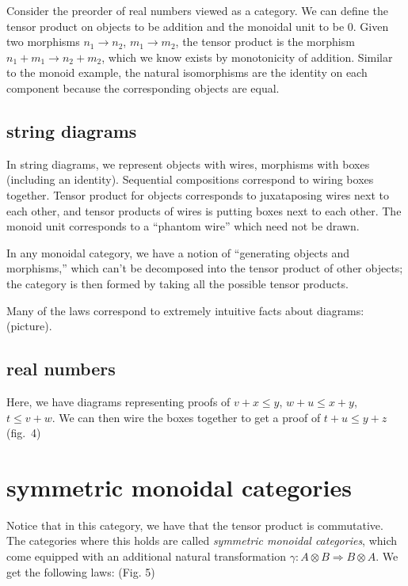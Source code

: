 Consider the preorder of real numbers viewed as a category. We can
define the tensor product on objects to be addition and the monoidal
unit to be 0. Given two morphisms \(n_1 \to n_2\), \(m_1 \to m_2\), the
tensor product is the morphism \(n_1 + m_1 \to n_2 + m_2\), which we
know exists by monotonicity of addition. Similar to the monoid example,
the natural isomorphisms are the identity on each component because the
corresponding objects are equal.

\hypertarget{string-diagrams}{%
\subsection{string diagrams}\label{string-diagrams}}

In string diagrams, we represent objects with wires, morphisms with
boxes (including an identity). Sequential compositions correspond to
wiring boxes together. Tensor product for objects corresponds to
juxataposing wires next to each other, and tensor products of wires is
putting boxes next to each other. The monoid unit corresponds to a
``phantom wire'' which need not be drawn.

In any monoidal category, we have a notion of ``generating objects and
morphisms,'' which can't be decomposed into the tensor product of other
objects; the category is then formed by taking all the possible tensor
products.

Many of the laws correspond to extremely intuitive facts about diagrams:
(picture).

\hypertarget{real-numbers-1}{%
\subsection{real numbers}\label{real-numbers-1}}

Here, we have diagrams representing proofs of \(v+x \le y\),
\(w + u \le x + y\), \(t \le v + w\). We can then wire the boxes
together to get a proof of \(t + u \le y + z\) (fig.~4)

\hypertarget{symmetric-monoidal-categories}{%
\section{symmetric monoidal
categories}\label{symmetric-monoidal-categories}}

Notice that in this category, we have that the tensor product is
commutative. The categories where this holds are called \emph{symmetric
monoidal categories}, which come equipped with an additional natural
transformation \(\gamma : A \otimes B \Rightarrow B \otimes A\). We get
the following laws: (Fig. 5)

